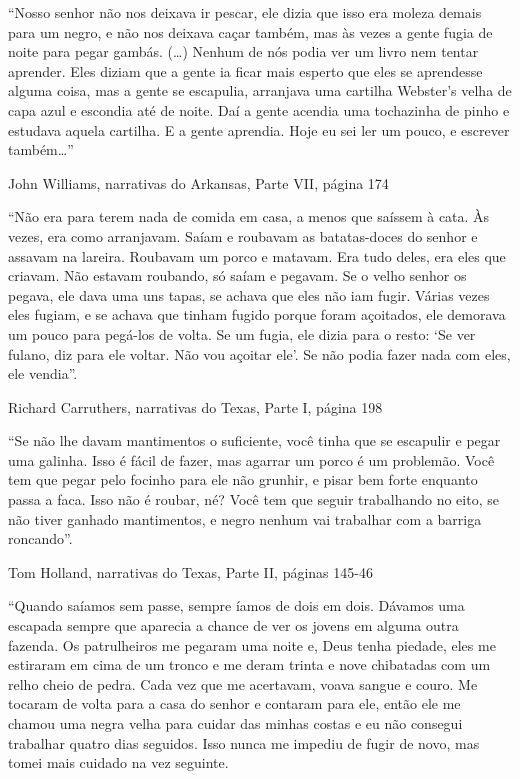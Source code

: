 ``Nosso senhor não nos deixava ir pescar, ele dizia que isso era moleza
demais para um negro, e não nos deixava caçar também, mas às vezes a
gente fugia de noite para pegar gambás. (\ldots{}) Nenhum de nós podia
ver um livro nem tentar aprender. Eles diziam que a gente ia ficar mais
esperto que eles se aprendesse alguma coisa, mas a gente se escapulia,
arranjava uma cartilha Webster's velha de capa azul e escondia até de
noite. Daí a gente acendia uma tochazinha de pinho e estudava aquela
cartilha. E a gente aprendia. Hoje eu sei ler um pouco, e escrever
também\ldots{}''

John Williams, narrativas do Arkansas, Parte VII, página 174

``Não era para terem nada de comida em casa, a menos que saíssem à cata.
Às vezes, era como arranjavam. Saíam e roubavam as batatas-doces do
senhor e assavam na lareira. Roubavam um porco e matavam. Era tudo
deles, era eles que criavam. Não estavam roubando, só saíam e pegavam.
Se o velho senhor os pegava, ele dava uma uns tapas, se achava que eles
não iam fugir. Várias vezes eles fugiam, e se achava que tinham fugido
porque foram açoitados, ele demorava um pouco para pegá-los de volta. Se
um fugia, ele dizia para o resto: `Se ver fulano, diz para ele voltar.
Não vou açoitar ele'. Se não podia fazer nada com eles, ele vendia''.

Richard Carruthers, narrativas do Texas, Parte I, página 198

``Se não lhe davam mantimentos o suficiente, você tinha que se escapulir
e pegar uma galinha. Isso é fácil de fazer, mas agarrar um porco é um
problemão. Você tem que pegar pelo focinho para ele não grunhir, e pisar
bem forte enquanto passa a faca. Isso não é roubar, né? Você tem que
seguir trabalhando no eito, se não tiver ganhado mantimentos, e negro
nenhum vai trabalhar com a barriga roncando''.

Tom Holland, narrativas do Texas, Parte II, páginas 145-46

``Quando saíamos sem passe, sempre íamos de dois em dois. Dávamos uma
escapada sempre que aparecia a chance de ver os jovens em alguma outra
fazenda. Os patrulheiros me pegaram uma noite e, Deus tenha piedade,
eles me estiraram em cima de um tronco e me deram trinta e nove
chibatadas com um relho cheio de pedra. Cada vez que me acertavam, voava
sangue e couro. Me tocaram de volta para a casa do senhor e contaram
para ele, então ele me chamou uma negra velha para cuidar das minhas
costas e eu não consegui trabalhar quatro dias seguidos. Isso nunca me
impediu de fugir de novo, mas tomei mais cuidado na vez seguinte.

